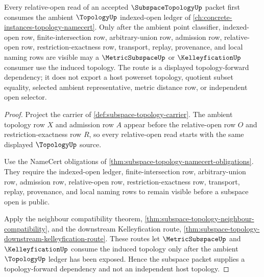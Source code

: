\begin{theorem}
\label{thm:subspace-topology-topology-forward-route}
Every relative-open read of an accepted $\SubspaceTopologyUp$ packet first consumes the ambient $\TopologyUp$ indexed-open ledger of \autoref{ch:concrete-instances-topology-namecert}. Only after the ambient point classifier, indexed-open row, finite-intersection row, arbitrary-union row, admission row, relative-open row, restriction-exactness row, transport, replay, provenance, and local naming rows are visible may a $\MetricSubspaceUp$ or $\KelleyficationUp$ consumer use the induced topology. The route is a displayed topology-forward dependency; it does not export a host powerset topology, quotient subset equality, selected ambient representative, metric distance row, or independent open selector.
\end{theorem}
\begin{proof}
Project the carrier of \autoref{def:subspace-topology-carrier}. The ambient topology row $X$ and admission row $A$ appear before the relative-open row $O$ and restriction-exactness row $R$, so every relative-open read starts with the same displayed $\TopologyUp$ source.

Use the NameCert obligations of \autoref{thm:subspace-topology-namecert-obligations}. They require the indexed-open ledger, finite-intersection row, arbitrary-union row, admission row, relative-open row, restriction-exactness row, transport, replay, provenance, and local naming rows to remain visible before a subspace open is public.

Apply the neighbour compatibility theorem, \autoref{thm:subspace-topology-neighbour-compatibility}, and the downstream Kelleyfication route, \autoref{thm:subspace-topology-downstream-kelleyfication-route}. These routes let $\MetricSubspaceUp$ and $\KelleyficationUp$ consume the induced topology only after the ambient $\TopologyUp$ ledger has been exposed. Hence the subspace packet supplies a topology-forward dependency and not an independent host topology.
\end{proof}
